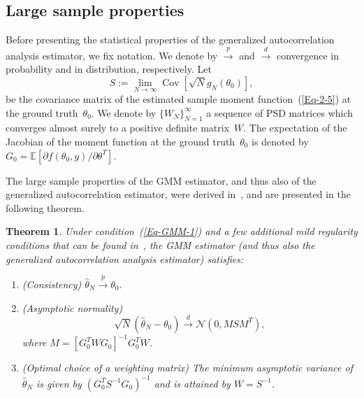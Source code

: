 \documentclass{article}
\newtheorem{theorem}[assumption]{Theorem}%
\newcommand{\E}[0]{\mathbb{E}}
\newcommand{\Cov}[0]{\operatorname{Cov}}
\begin{document}
\subsection{Large sample properties}
\label{gmm:large}
Before presenting the statistical properties of the generalized autocorrelation analysis estimator, we fix notation. We denote by $\overset{p}{\to}$ and $\overset{d}{\to}$ convergence in  probability and in distribution, respectively. Let
\begin{equation} \label{eqn:cov_mat_S}
	S := \lim_{N\to \infty}\Cov\left[\sqrt{N}g_N(\theta_0)\right],
\end{equation}
be the covariance matrix of the estimated sample moment function~(\ref{Eq-2-5}) at the ground truth~$\theta_0$. We denote by $\{W_N\}_{N=1}^\infty$ a sequence of PSD matrices which converges almost surely to a positive definite matrix~$W$. The expectation of the Jacobian of the moment function at the ground truth~$\theta_0$ is denoted by $G_0 = \E\left[\partial f(\theta_0, y) / \partial \theta^T\right]$.

The large sample properties of the GMM estimator, and thus also of the generalized autocorrelation estimator,  were derived in~\cite{Hansen1982}, and are presented in the following theorem. %

\begin{theorem}\label{Thm-2-6}
	{Under condition~(\ref{Eq-GMM-1}) and a few additional mild regularity conditions that can be found in~\cite{Hansen1982,Hall2005,abas2021generalized}}, the GMM estimator (and thus also the generalized autocorrelation analysis estimator) satisfies:
	\begin{enumerate}[label={\Alph*}.]
		\item  \label{Thm-2-2}
		\textnormal{(Consistency)} $\hat{\theta}_N \overset{p}{\to} \theta_0$.

		\item \label{Thm-2-3} \textnormal{(Asymptotic normality)}
		\[\sqrt{N} ( \hat{\theta}_N - \theta_0) \overset{d}{\to} \mathcal{N}(0, M S M^T ),\] where $M =[G_0^T W  G_0]^{-1} G_0^T  W$.

		\item \label{Thm-2-5} \textnormal{(Optimal choice of a weighting matrix)} The minimum asymptotic variance of $\hat{\theta}_N$ is given by $(G_0^T S^{-1} G_0)^{-1}$ and is attained by $W = S^{-1}$.
	\end{enumerate}
\end{theorem}
\end{document}
